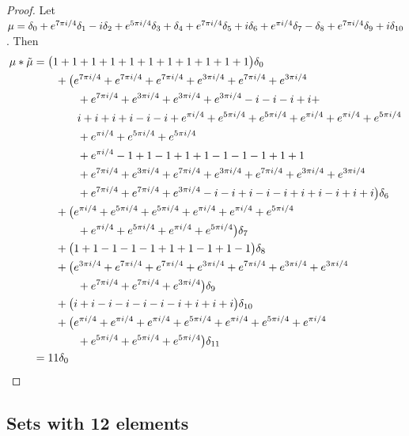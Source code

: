  
\begin{proof}
Let  $\mu =  \delta_{0}+e^{7\pi i/4}\delta_{1}-i\delta_{2}+e^{5\pi i/4}\delta_{3}+\delta_{4}+e^{7\pi i/4}\delta_{5}+i\delta_{6}+e^{\pi i/4}\delta_{7}-\delta_{8}+e^{7\pi i/4}\delta_{9}+i\delta_{10}
$.  Then 
\begin{align*} 
\mu * \tilde \mu & = \big(1+1+1+1+1+1+1+1+1+1+1\big)\delta_{0}
\\&\qquad
+\big(e^{7\pi i/4}+e^{7\pi i/4}+e^{7\pi i/4}+e^{3\pi i/4}+e^{7\pi i/4}+e^{3\pi i/4}
\\&\qquad\qquad +e^{7\pi i/4}+e^{3\pi i/4}+e^{3\pi i/4}+e^{3\pi i/4}-i-i-i+i+
\\&\qquad\qquad
i+i+i+i-i-i+e^{\pi i/4}
+e^{5\pi i/4}+e^{5\pi i/4}+e^{\pi i/4}+e^{\pi i/4}+e^{5\pi i/4}
\\&\qquad\qquad
+e^{\pi i/4}+e^{5\pi i/4}+e^{5\pi i/4}
\\&\qquad\qquad
+e^{\pi i/4}-1+1-1+1+1-1-1-1+1+1
\\&\qquad\qquad
+e^{7\pi i/4}+e^{3\pi i/4}+e^{7\pi i/4}+e^{3\pi i/4}+e^{7\pi i/4}+e^{3\pi i/4}+e^{3\pi i/4}
\\&\qquad\qquad+e^{7\pi i/4}+e^{7\pi i/4}+e^{3\pi i/4}-i-i+i-i-i+i+i-i+i+i\big)\delta_{6}
\\&\qquad
+\big(e^{\pi i/4}+e^{5\pi i/4}+e^{5\pi i/4}+e^{\pi i/4}+e^{\pi i/4}+e^{5\pi i/4}
\\&\qquad\qquad
+e^{\pi i/4}+e^{5\pi i/4}+e^{\pi i/4}+e^{5\pi i/4}\big)\delta_{7}
\\&\qquad
+\big(1+1-1-1-1+1+1-1+1-1\big)\delta_{8}
\\&\qquad
+\big(e^{3\pi i/4}+e^{7\pi i/4}+e^{7\pi i/4}+e^{3\pi i/4}+e^{7\pi i/4}+e^{3\pi i/4}+e^{3\pi i/4}
\\&\qquad\qquad+e^{7\pi i/4}+e^{7\pi i/4}+e^{3\pi i/4}\big)\delta_{9}
\\&\qquad
+\big(i+i-i-i-i-i-i+i+i+i\big)\delta_{10}
\\&\qquad
+\big(e^{\pi i/4}+e^{\pi i/4}+e^{\pi i/4}+e^{5\pi i/4}+e^{\pi i/4}+e^{5\pi i/4}+e^{\pi i/4}
\\&\qquad\qquad+e^{5\pi i/4}+e^{5\pi i/4}+e^{5\pi i/4}\big)\delta_{11}\\&=11\delta_{0 }\qedhere
\end{align*}
\end{proof}



\subsection{Sets with 12 elements}
 
